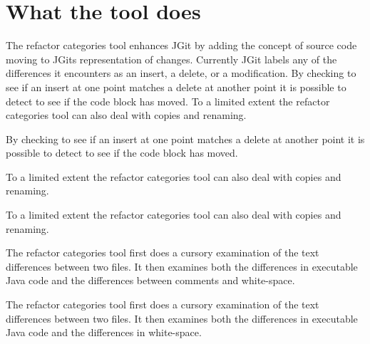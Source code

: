 \section{What the tool does}
The refactor categories tool enhances JGit by adding the concept of source code moving to JGits representation of changes.
Currently JGit labels any of the differences it encounters as an insert, a delete, or a modification.  By checking to see if an insert at one point matches a delete at another point it is possible to detect to see if the code block has moved.
To a limited extent the refactor categories tool can also deal with copies and renaming.

By checking to see if an insert at one point matches a delete at another point it is possible to detect to see if the code block has moved.

To a limited extent the refactor categories tool can also deal with copies and renaming.

To a limited extent the refactor categories tool can also deal with copies and renaming.

The refactor categories tool first does a cursory examination of the text differences between two files. It then examines both the differences in executable Java code and the differences between comments and white-space. 
% 


The refactor categories tool first does a cursory examination of the text differences between two files. It then examines both the differences in executable Java code and the differences in white-space.

